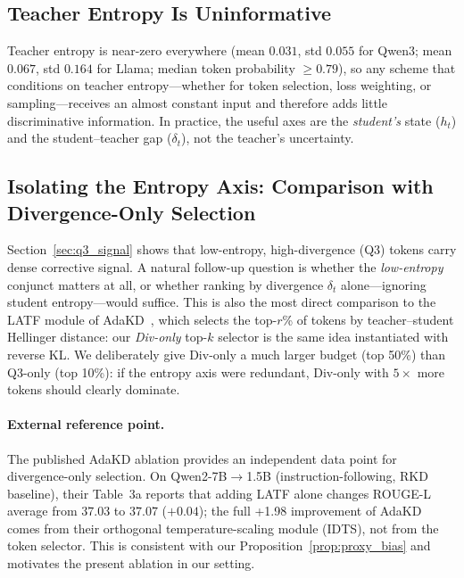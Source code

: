 \documentclass{article}
\begin{document}
\subsection{Teacher Entropy Is Uninformative}
\label{app:teacher_entropy}

Teacher entropy is near-zero everywhere (mean $0.031$, std $0.055$ for Qwen3; mean $0.067$, std $0.164$ for Llama; median token probability ${\geq}0.79$), so any scheme that conditions on teacher entropy---whether for token selection, loss weighting, or sampling---receives an almost constant input and therefore adds little discriminative information. In practice, the useful axes are the \emph{student's} state ($h_t$) and the student--teacher gap ($\delta_t$), not the teacher's uncertainty.

\subsection{Isolating the Entropy Axis: Comparison with Divergence-Only Selection}
\label{app:div_only}

Section~\ref{sec:q3_signal} shows that low-entropy, high-divergence (Q3) tokens carry dense corrective signal.
A natural follow-up question is whether the \emph{low-entropy} conjunct matters at all, or whether ranking by divergence $\delta_t$ alone---ignoring student entropy---would suffice.
This is also the most direct comparison to the LATF module of AdaKD~\citep{xie2026adakd}, which selects the top-$r$\% of tokens by teacher--student Hellinger distance: our \emph{Div-only} top-$k$ selector is the same idea instantiated with reverse KL.
We deliberately give Div-only a much larger budget (top 50\%) than Q3-only (top 10\%): if the entropy axis were redundant, Div-only with $5\times$ more tokens should clearly dominate.

\paragraph{External reference point.}
The published AdaKD ablation provides an independent data point for divergence-only selection.
On Qwen2-7B$\to$1.5B (instruction-following, RKD baseline), their Table~3a reports that adding LATF alone changes ROUGE-L average from $37.03$ to $37.07$ ($+0.04$); the full +1.98 improvement of AdaKD comes from their orthogonal temperature-scaling module (IDTS), not from the token selector.
This is consistent with our Proposition~\ref{prop:proxy_bias} and motivates the present ablation in our setting.
\end{document}
